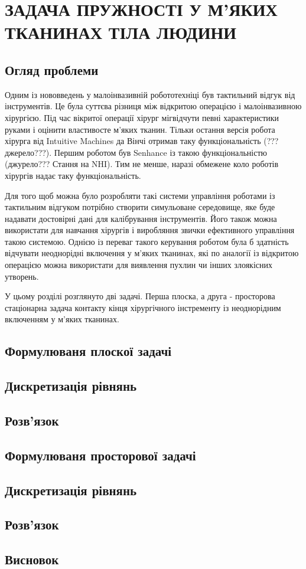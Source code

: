 \chapter{ЗАДАЧА ПРУЖНОСТІ У М'ЯКИХ ТКАНИНАХ ТІЛА ЛЮДИНИ}

\nocite{bahvalov-et-al,benerdge-et-al} 

\section{Огляд проблеми}

Одним із нововведень у малоінвазивній робототехніці був тактильний відгук від інструментів. Це була суттєва різниця між
відкритою операцією і малоінвазивною хірургією. Під час вікритої операції хірург міг відчути певні
характеристики руками і оцінити властивосте м'яких тканин. Тільки остання версія робота хірурга від Intuitive Machines
да Вінчі отримав таку функціональність (???джерело???). Першим роботом був Senhance із такою функціональністю
(джурело??? Стання на NHI). Тим не менше, наразі обмежене коло роботів хірургів надає таку функціональність.

Для того щоб можна було розробляти такі системи управління роботами із тактильним відгуком потрібно створити симульоване 
середовище, яке буде надавати достовірні дані для калібрування інструментів. Його також можна використати для навчання
хірургів і виробляння звички ефективного управління такою системою. Однією із переваг такого керування роботом була б 
здатність відчувати неоднорідні включення у м'яких тканинах, які по аналогії із відкритою операцією можна використати 
для виявлення пухлин чи інших злоякісних утворень.

У цьому розділі розглянуто дві задачі. Перша плоска, а друга - просторова стаціонарна задача контакту кінця хірургічного 
інстременту із неоднорідним включенням у м'яких тканинах. 

\section{Формулюваня плоскої задачі}

\section{Дискретизація рівнянь}

\section{Розв'язок}

\section{Формулюваня просторової задачі}

\section{Дискретизація рівнянь}

\section{Розв'язок}

\section{Висновок}
